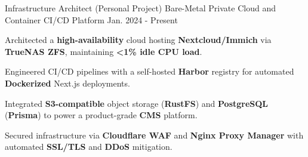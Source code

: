 \begin{cventries}
  \vspace{0.4cm} %

\cventry
    {Infrastructure Architect (Personal Project)} 
    {Bare-Metal Private Cloud and Container CI/CD Platform}
    {Jan. 2024 - Present} %
    {} 
    {%
      \begin{cvitems} %
        \item {Architected a \textbf{high-availability} cloud hosting \textbf{Nextcloud/Immich} via \textbf{TrueNAS ZFS}, maintaining \textbf{<1\% idle CPU load}.}
        \item {Engineered CI/CD pipelines with a self-hosted \textbf{Harbor} registry for automated \textbf{Dockerized} Next.js deployments.}
        \item {Integrated \textbf{S3-compatible} object storage (\textbf{RustFS}) and \textbf{PostgreSQL} (\textbf{Prisma}) to power a product-grade \textbf{CMS} platform.}
        \item {Secured infrastructure via \textbf{Cloudflare WAF} and \textbf{Nginx Proxy Manager} with automated \textbf{SSL/TLS} and \textbf{DDoS} mitigation.}
      \end{cvitems}
    }

\end{cventries}
